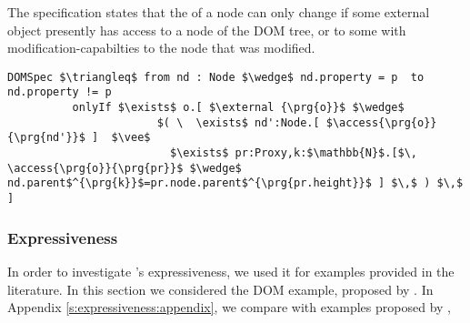 The specification  states that the  of a node can only change if
some external object presently has 
access to a node of the DOM tree, or to some  with modification-capabilties
to the node that was modified.
\begin{lstlisting}[language = Chainmail, mathescape=true, frame=lines]
DOMSpec $\triangleq$ from nd : Node $\wedge$ nd.property = p  to nd.property != p
          onlyIf $\exists$ o.[ $\external {\prg{o}}$ $\wedge$ 
                       $( \  \exists$ nd':Node.[ $\access{\prg{o}}{\prg{nd'}}$ ]  $\vee$ 
                         $\exists$ pr:Proxy,k:$\mathbb{N}$.[$\, \access{\prg{o}}{\prg{pr}}$ $\wedge$ nd.parent$^{\prg{k}}$=pr.node.parent$^{\prg{pr.height}}$ ] $\,$ ) $\,$ ]
\end{lstlisting}

\subsubsection{Expressiveness}
In order to investigate \Nec's expressiveness,  
we used it for
examples provided in the literature. In this section we considered the DOM example, 
proposed by  \citeauthor{dd}. In Appendix \ref{s:expressiveness:appendix},
we compare with examples proposed by  \citeauthor{FASE}, 
 

